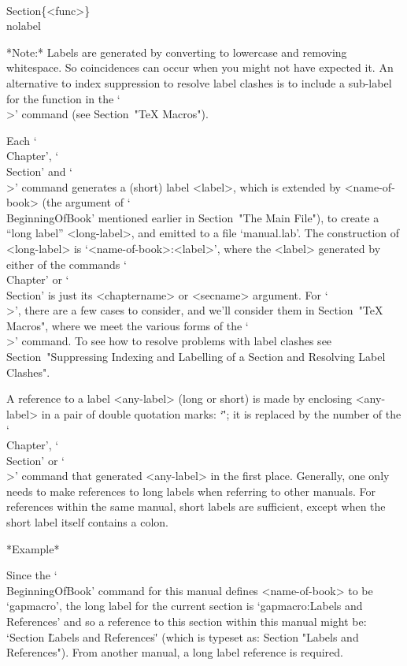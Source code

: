 \)\\Section\{<func>\}\\nolabel

*Note:* Labels are generated by  converting  to  lowercase  and  removing
whitespace. So coincidences can occur when you might  not  have  expected
it. An alternative to index suppression to resolve label  clashes  is  to
include  a  sub-label  for  the  function  in  the  `\\>'  command   (see
Section~"TeX Macros").


Each `\\Chapter', `\\Section' and `\\>' command generates a (short) label
<label>,  which  is  extended  by   <name-of-book>   (the   argument   of
`\\BeginningOfBook' mentioned earlier in  Section~"The  Main  File"),  to
create a ``long label'' <long-label>, and emitted to a file `manual.lab'.
The construction of <long-label> is `<name-of-book>:<label>',  where  the
<label> generated by either of the commands `\\Chapter' or `\\Section' is
just its <chaptername> or <secname> argument. For `\\>', there are a  few
cases to consider, and we'll consider them in Section~"TeX Macros", where
we meet the various forms of the `\\>' command. To  see  how  to  resolve
problems  with  label  clashes  see  Section~"Suppressing  Indexing   and
Labelling of a Section and Resolving Label Clashes".

A reference to a label <any-label> (long or short) is made  by  enclosing
<any-label> in a pair of double quotation marks: `\"<any-label>\"'; it is
replaced by the number of the `\\Chapter', `\\Section' or  `\\>'  command
that generated <any-label> in the first place. Generally, one only  needs
to make references to long labels when referring to  other  manuals.  For
references within the same manual, short labels  are  sufficient,  except
when the short label itself contains a colon.

*Example*

Since  the  `\\BeginningOfBook'   command   for   this   manual   defines
<name-of-book> to be `gapmacro',
the long label for  the  current  section  is
`gapmacro:Labels and References'
and so a reference  to  this  section  within
this manual might be:  `Section  \"Labels  and  References\"'  (which  is
typeset as: Section "Labels and References"). From another manual, a long
label reference is required.

